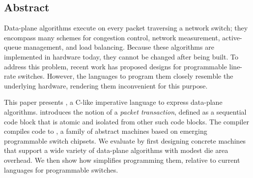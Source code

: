 \subsection*{Abstract}
Data-plane algorithms execute on every packet traversing a network switch; they
encompass many schemes for congestion control, network measurement,
active-queue management, and load balancing. Because these algorithms are
implemented in hardware today, they cannot be changed after being built. To
address this problem, recent work has proposed designs for programmable
line-rate switches.  However, the languages to program them closely resemble
the underlying hardware, rendering them inconvenient for this purpose.

This paper presents \pktlanguage, a C-like imperative language to express
data-plane algorithms. \pktlanguage introduces the notion of a {\em packet
transaction}, defined as a sequential code block that is atomic and isolated
from other such code blocks.  The \pktlanguage compiler compiles \pktlanguage
code to \absmachine, a family of abstract machines based on emerging
programmable switch chipsets. We evaluate \pktlanguage by first designing
concrete \absmachine machines that support a wide variety of data-plane
algorithms with modest die area overhead. We then show how \pktlanguage
simplifies programming them, relative to current languages for programmable
switches.
